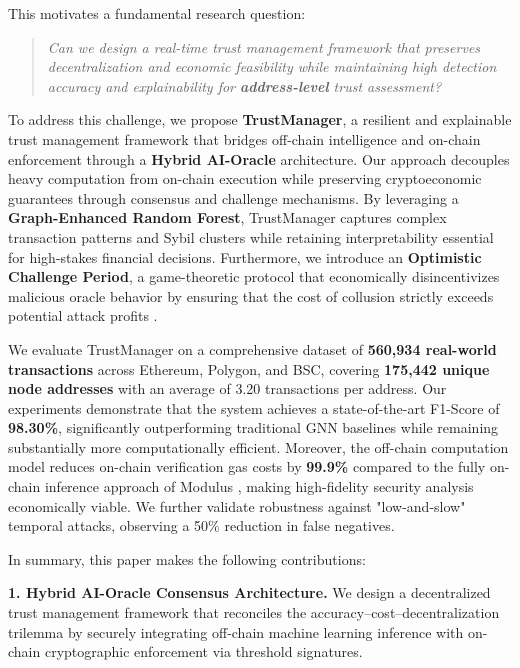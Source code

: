 \documentclass[runningheads]{llncs}
\begin{document}
This motivates a fundamental research question:

\begin{quote}
\textit{Can we design a real-time trust management framework that preserves decentralization and economic feasibility while maintaining high detection accuracy and explainability for \textbf{address-level} trust assessment?}
\end{quote}

To address this challenge, we propose \textbf{TrustManager}, a resilient and explainable trust management framework that bridges off-chain intelligence and on-chain enforcement through a \textbf{Hybrid AI-Oracle} architecture. Our approach decouples heavy computation from on-chain execution while preserving cryptoeconomic guarantees through consensus and challenge mechanisms. By leveraging a \textbf{Graph-Enhanced Random Forest}, TrustManager captures complex transaction patterns and Sybil clusters \cite{douceur2002sybil} while retaining interpretability essential for high-stakes financial decisions. Furthermore, we introduce an \textbf{Optimistic Challenge Period}, a game-theoretic protocol that economically disincentivizes malicious oracle behavior by ensuring that the cost of collusion strictly exceeds potential attack profits \cite{yaish2024speculative}.

We evaluate TrustManager on a comprehensive dataset of \textbf{560,934 real-world transactions} across Ethereum, Polygon, and BSC, covering \textbf{175,442 unique node addresses} with an average of 3.20 transactions per address. Our experiments demonstrate that the system achieves a state-of-the-art F1-Score of \textbf{98.30\%}, significantly outperforming traditional GNN baselines while remaining substantially more computationally efficient. Moreover, the off-chain computation model reduces on-chain verification gas costs by \textbf{99.9\%} compared to the fully on-chain inference approach of Modulus \cite{modulus2023}, making high-fidelity security analysis economically viable. We further validate robustness against "low-and-slow" temporal attacks, observing a 50\% reduction in false negatives.

In summary, this paper makes the following contributions:

\textbf{1. Hybrid AI-Oracle Consensus Architecture.} We design a decentralized trust management framework that reconciles the accuracy--cost--decentralization trilemma by securely integrating off-chain machine learning inference with on-chain cryptographic enforcement via threshold signatures.
\end{document}
